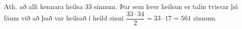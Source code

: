 Ath. að alli kennara heilsa 33 sinnum. Þar sem hver heilsun er talin tvisvar þá fáum við að það var heilsað í heild sinni $\dfrac{33\cdot 34}{2}=33\cdot 17=561$ sinnum.
